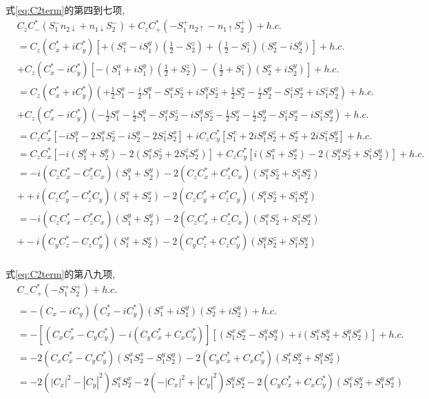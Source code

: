\documentclass[a4paper, 12pt]{article}
\begin{document}
式\eqref{eq:C2term}的第四到七项,
\begin{equation}
  \begin{aligned}
    &C_zC_-^*(S_1^-n_{2\downarrow} + n_{1\downarrow}S_2^-) + C_zC_+^*(-S_1^+n_{2\uparrow} - n_{1\uparrow}S_2^+) + h.c.\\
    &= C_z(C_x^*+iC_y^*)[+(S_1^x - iS_1^y)(\frac{1}{2} - S_2^z) + (\frac{1}{2} - S_1^z)(S_2^x - iS_2^y)] + h.c.\\
    &+ C_z(C_x^*-iC_y^*)[-(S_1^x + iS_1^y)(\frac{1}{2} + S_2^z) - (\frac{1}{2} + S_1^z)(S_2^x + iS_2^y)] + h.c.\\
    &= C_z(C_x^*+iC_y^*)(+\frac{1}{2}S_1^x - \frac{i}{2}S_1^y - S_1^xS_2^z + iS_1^yS_2^z + \frac{1}{2}S_2^x - \frac{i}{2}S_2^y - S_1^zS_2^x + iS_1^zS_2^y) + h.c.\\
    &+ C_z(C_x^*-iC_y^*)(-\frac{1}{2}S_1^x - \frac{i}{2}S_1^y - S_1^xS_2^z - iS_1^yS_2^z - \frac{1}{2}S_2^x - \frac{i}{2}S_2^y - S_1^zS_2^x - iS_1^zS_2^y) + h.c.\\
    &= C_zC_x^*[-iS_1^y -2S_1^xS_2^z -iS_2^y -2S_1^zS_2^x] + iC_zC_y^*[S_1^x + 2iS_1^yS_2^z + S_2^x + 2iS_1^zS_2^y] + h.c.\\
    &= C_zC_x^*[-i(S_1^y+S_2^y) -2(S_1^xS_2^z + 2S_1^zS_2^x)] + C_zC_y^*[i(S_1^x +  S_2^x) - 2(S_1^yS_2^z + S_1^zS_2^y)] + h.c.\\
    &= -i(C_zC_x^*-C_z^*C_x)(S_1^y+S_2^y) - 2(C_zC_x^*+C_z^*C_x)(S_1^xS_2^z + S_1^zS_2^x)\\
    &+ +i(C_zC_y^* - C_z^*C_y)(S_1^x + S_2^x) - 2(C_zC_y^* + C_z^*C_y)(S_1^yS_2^z + S_1^zS_2^y)\\
    &= -i(C_zC_x^* - C_z^*C_x)(S_1^y + S_2^y) - 2(C_zC_x^* + C_z^*C_x)(S_1^xS_2^z + S_1^zS_2^x)\\
    &+ -i(C_yC_z^* - C_zC_y^*)(S_1^x + S_2^x) - 2(C_yC_z^* + C_zC_y^*)(S_1^yS_2^z + S_1^zS_2^y)\\
  \end{aligned}
\end{equation}

式\eqref{eq:C2term}的第八九项,
\begin{equation}
  \begin{aligned}
    &C_-C_+^*(-S_1^+S_2^+) + h.c.\\
    &= -(C_x - iC_y)(C_x^* - iC_y^*)(S_1^x + iS_1^y)(S_2^x + iS_2^y) + h.c.\\
    &= -[(C_xC_x^*-C_yC_y^*)-i(C_yC_x^*+C_xC_y^*)][(S_1^xS_2^x-S_1^yS_2^y) + i(S_1^xS_2^y+S_1^yS_2^x)] + h.c.\\
    &= -2(C_xC_x^*-C_yC_y^*)(S_1^xS_2^x-S_1^yS_2^y) - 2(C_yC_x^*+C_xC_y^*)(S_1^xS_2^y+S_1^yS_2^x)\\
    &= -2(|C_x|^2-|C_y|^2)S_1^xS_2^x -2(-|C_x|^2+|C_y|^2)S_1^yS_2^y- 2(C_yC_x^*+C_xC_y^*)(S_1^xS_2^y+S_1^yS_2^x)
  \end{aligned}
\end{equation}
\end{document}
